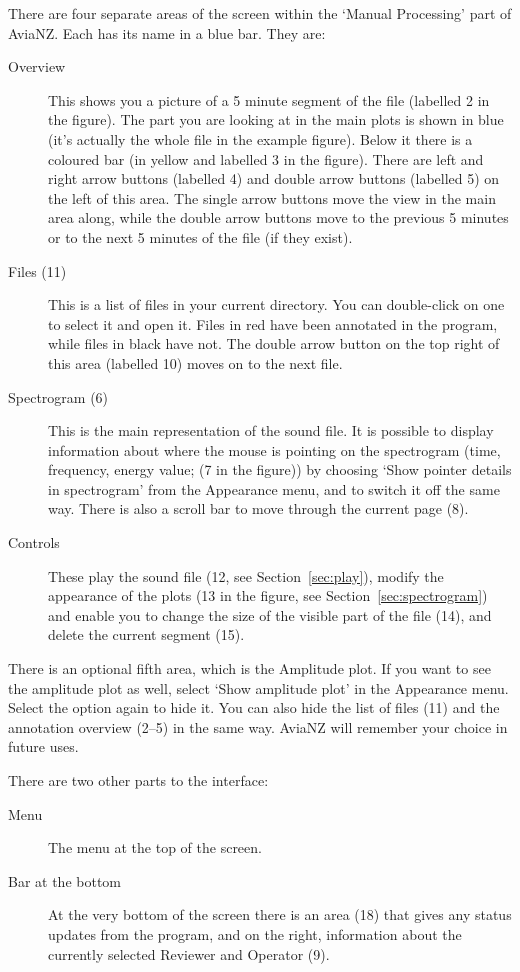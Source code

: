\documentclass{article}
\begin{document}
There are four separate areas of the screen within the `Manual Processing' part of AviaNZ. Each has its name in a blue bar. They are:
	\begin{description}
	\item[Overview] This shows you a picture of a 5 minute segment of the file (labelled 2 in the figure). The part you are looking at in the main plots is shown in blue (it's actually the whole file in the example figure). Below it there is a coloured bar (in yellow and labelled 3 in the figure). There are left and right arrow buttons (labelled 4) and double arrow buttons (labelled 5) on the left of this area. The single arrow buttons move the view in the main area along, while the double arrow buttons move to the previous 5 minutes or to the next 5 minutes of the file (if they exist). 
	\item [Files (11)] This is a list of files in your current directory. You can double-click on one to select it and open it. Files in red have been annotated in the program, while files in black have not. The double arrow button on the top right of this area (labelled 10) moves on to the next file.
	\item[Spectrogram (6)] This is the main representation of the sound file. It is possible to display information about where the mouse is pointing on the spectrogram (time, frequency, energy value; (7 in the figure)) by choosing `Show pointer details in spectrogram' from the Appearance menu, and to switch it off the same way. There is also a scroll bar to move through the current page (8).
	\item[Controls] These play the sound file (12, see Section~\ref{sec:play}), modify the appearance of the plots (13 in the figure, see Section~\ref{sec:spectrogram}) and enable you to change the size of the visible part of the file (14), and delete the current segment (15).
	\end{description}

There is an optional fifth area, which is the Amplitude plot. If you want to see the amplitude plot as well, select `Show amplitude plot' in the Appearance menu. Select the option again to hide it. You can also hide the list of files (11) and the annotation overview (2--5) in the same way. AviaNZ will remember your choice in future uses.

There are two other parts to the interface:
	\begin{description}
	\item[Menu] The menu at the top of the screen. 
	\item[Bar at the bottom] At the very bottom of the screen there is an area (18) that gives any status updates from the program, and on the right, information about the currently selected Reviewer and Operator (9).
	\end{description}
\end{document}
